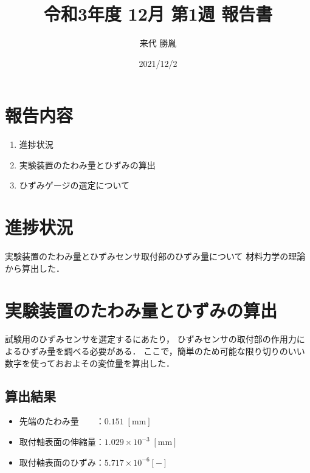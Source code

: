 \documentclass[twocolumn,a4j]{jsarticle}
\author{来代 勝胤}
\title{令和3年度 12月 第1週 報告書}
\date{2021/12/2}
\begin{document}
\columnseprule=0.1mm

\maketitle
\section*{報告内容}
\begin{enumerate}[1.]
    \item 進捗状況
    \item 実験装置のたわみ量とひずみの算出
    \item ひずみゲージの選定について
\end{enumerate}

\section{進捗状況}
実験装置のたわみ量とひずみセンサ取付部のひずみ量について
材料力学の理論から算出した．

\section{実験装置のたわみ量とひずみの算出}
    試験用のひずみセンサを選定するにあたり，
    ひずみセンサの取付部の作用力によるひずみ量を調べる必要がある．
    ここで，簡単のため可能な限り切りのいい数字を使っておおよその変位量を算出した．\\

\subsection{算出結果}
\begin{screen}
    \begin{itemize}
        \item 先端のたわみ量　　：$0.151 \;\left[\mathrm{mm}\right]$
        \item 取付軸表面の伸縮量：$1.029 × 10^{-3} \;\left[\mathrm{mm}\right]$
        \item 取付軸表面のひずみ：$5.717 × 10^{-6} \left[\mathrm{-}\right]$
    \end{itemize}
\end{screen}
\end{document}
